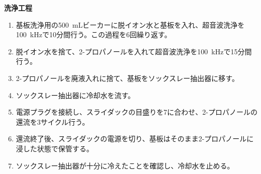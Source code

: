 \noindent\textbf{洗浄工程}
\begin{enumerate}
    \item 基板洗浄用の\SI{500}{\milli\liter}ビーカーに脱イオン水と基板を入れ、超音波洗浄を\SI{100}{\kilo\hertz}で10分間行う。この過程を6回繰り返す。
    \item 脱イオン水を捨て、2-プロパノールを入れて超音波洗浄を\SI{100}{\kilo\hertz}で15分間行う。
    \item 2-プロパノールを廃液入れに捨て、基板をソックスレー抽出器に移す。
    \item ソックスレー抽出器に冷却水を流す。
    \item 電源プラグを接続し、スライダックの目盛りを7に合わせ、2-プロパノールの還流を3サイクル行う。
    \item 還流終了後、スライダックの電源を切り、基板はそのまま2-プロパノールに浸した状態で保管する。
    \item ソックスレー抽出器が十分に冷えたことを確認し、冷却水を止める。
\end{enumerate}


